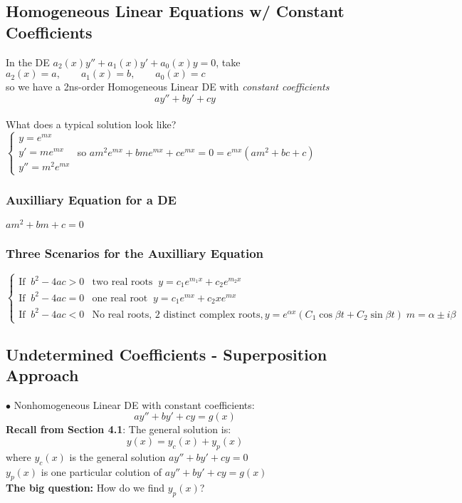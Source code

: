 \documentclass{article}
\begin{document}
\subsection{Homogeneous Linear Equations w/ Constant Coefficients}
In the DE $a_2(x)y''+a_1(x)y'+a_0(x)y=0$, take \\
$a_2(x)=a,\qquad a_1(x)=b,\qquad a_0(x)=c$
\\ so we have a 2ns-order Homogeneous Linear DE with \textit{constant coefficients}
$$ay''+by'+cy$$
\\What does a typical solution look like?
\\$\begin{cases}
    y=e^{mx}
    \\y'=me^{mx}
    \\y''=m^2e^{mx}
\end{cases}$ so $am^2e^{mx}+bme^{mx}+ce^{mx}=0=e^{mx}(am^2+bc+c)$
\subsubsection{Auxilliary Equation for a DE} $am^2+bm+c=0$
\subsubsection{Three Scenarios for the Auxilliary Equation}
$\begin{cases}
    \text{If}\;\; b^2-4ac>0 & \text{two real roots}\;\; y=c_1e^{m_1x}+c_2e^{m_2x}
    \\ \text{If}\;\; b^2-4ac=0 & \text{one real root}\;\; y=c_1e^{mx}+c_2xe^{mx}
    \\\text{If}\;\; b^2-4ac<0 & \text{No real roots, 2 distinct complex roots}, y=e^{\alpha x}\left(C_1\cos \beta t +C_2\sin \beta t\right)\; m=\alpha \pm i\beta
\end{cases}$
\subsection{Undetermined Coefficients - Superposition Approach}
$\bullet$ Nonhomogeneous Linear DE with constant coefficients:
$$ay''+by'+cy=g(x)$$
\textbf{Recall from Section 4.1}: The general solution is: $$y(x)=y_c(x)+y_p(x)$$ where $y_c(x)$ is the general solution $ay''+by'+cy=0$\\ $y_p(x)$ is one particular colution of $ay''+by'+cy=g(x)$
\\\textbf{The big question:} How do we find $y_p(x)$?
\end{document}
